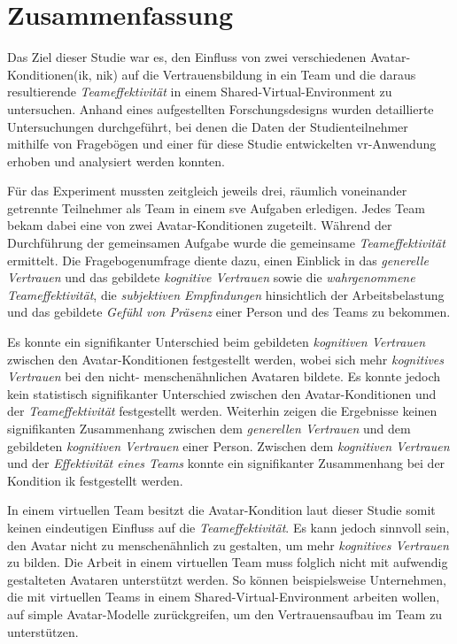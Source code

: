 \documentclass[a4paper,11pt]{article}%
\renewcommand{\\}{\vspace*{0.5\baselineskip} \newline}
\begin{document}
{{\section{Zusammenfassung}
Das Ziel dieser Studie war es, den Einfluss von zwei verschiedenen Avatar-Konditionen\newline (\ac{ik}, \ac{nik}) auf die Vertrauensbildung in ein Team und die daraus resultierende \textit{Teameffektivität} in einem Shared-Virtual-Environment zu untersuchen. 
Anhand eines aufgestellten Forschungsdesigns wurden detaillierte Untersuchungen durchgeführt, bei denen die Daten der Studienteilnehmer mithilfe von Fragebögen und einer für diese Studie entwickelten \ac{vr}-Anwendung erhoben und analysiert werden konnten.

Für das Experiment mussten zeitgleich jeweils drei, räumlich voneinander getrennte Teilnehmer als Team in einem \ac{sve} Aufgaben erledigen. Jedes Team bekam dabei eine von zwei Avatar-Konditionen zugeteilt. Während der Durchführung der gemeinsamen Aufgabe wurde die gemeinsame \textit{Teameffektivität} ermittelt. Die Fragebogenumfrage diente dazu, einen Einblick in das \textit{generelle Vertrauen} und das gebildete \textit{kognitive Vertrauen} sowie die \textit{wahrgenommene Teameffektivität}, die \textit{subjektiven Empfindungen} hinsichtlich der Arbeitsbelastung und das gebildete \textit{Gefühl von Präsenz} einer Person und des Teams zu bekommen.

Es konnte ein signifikanter Unterschied beim gebildeten \textit{kognitiven Vertrauen} zwischen den Avatar-Konditionen festgestellt werden, wobei sich mehr \textit{kognitives Vertrauen} bei den nicht- menschenähnlichen Avataren bildete. Es konnte jedoch kein statistisch signifikanter Unterschied zwischen den Avatar-Konditionen und der \textit{Teameffektivität} festgestellt werden. Weiterhin zeigen die Ergebnisse keinen signifikanten Zusammenhang zwischen dem \textit{generellen Vertrauen} und dem gebildeten \textit{kognitiven Vertrauen} einer Person. Zwischen dem \textit{kognitiven Vertrauen} und der \textit{Effektivität eines Teams} konnte ein signifikanter Zusammenhang bei der Kondition \ac{ik} festgestellt werden.

In einem virtuellen Team besitzt die Avatar-Kondition laut dieser Studie somit keinen eindeutigen Einfluss auf die \textit{Teameffektivität}. Es kann jedoch sinnvoll sein, den Avatar nicht zu menschenähnlich zu gestalten, um mehr \textit{kognitives Vertrauen} zu bilden.
Die Arbeit in einem virtuellen Team muss folglich nicht mit aufwendig gestalteten Avataren unterstützt werden. So können beispielsweise Unternehmen, die mit virtuellen Teams in einem Shared-Virtual-Environment arbeiten wollen, auf simple Avatar-Modelle zurückgreifen, um den Vertrauensaufbau im Team zu unterstützen.

}}
\end{document}
